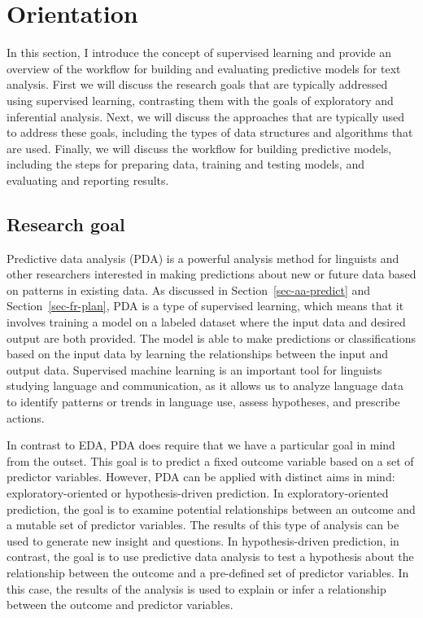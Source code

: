 \documentclass[
  letterpaper,
  DIV=11,
  numbers=noendperiod]{scrreprt}
\theoremstyle{definition}
\theoremstyle{remark}
\begin{document}
\section{Orientation}\label{sec-pda-orientation}

In this section, I introduce the concept of supervised learning and
provide an overview of the workflow for building and evaluating
predictive models for text analysis. First we will discuss the research
goals that are typically addressed using supervised learning,
contrasting them with the goals of exploratory and inferential analysis.
Next, we will discuss the approaches that are typically used to address
these goals, including the types of data structures and algorithms that
are used. Finally, we will discuss the workflow for building predictive
models, including the steps for preparing data, training and testing
models, and evaluating and reporting results.

\subsection{Research goal}\label{sec-pda-research-goal}

Predictive data analysis (PDA) is a powerful analysis method for
linguists and other researchers interested in making predictions about
new or future data based on patterns in existing data. As discussed in
Section~\ref{sec-aa-predict} and Section~\ref{sec-fr-plan}, PDA is a
type of supervised learning, which means that it involves training a
model on a labeled dataset where the input data and desired output are
both provided. The model is able to make predictions or classifications
based on the input data by learning the relationships between the input
and output data. Supervised machine learning is an important tool for
linguists studying language and communication, as it allows us to
analyze language data to identify patterns or trends in language use,
assess hypotheses, and prescribe actions.

In contrast to EDA, PDA does require that we have a particular goal in
mind from the outset. This goal is to predict a fixed outcome variable
based on a set of predictor variables. However, PDA can be applied with
distinct aims in mind: exploratory-oriented or hypothesis-driven
prediction. In exploratory-oriented prediction, the goal is to examine
potential relationships between an outcome and a mutable set of
predictor variables. The results of this type of analysis can be used to
generate new insight and questions. In hypothesis-driven prediction, in
contrast, the goal is to use predictive data analysis to test a
hypothesis about the relationship between the outcome and a pre-defined
set of predictor variables. In this case, the results of the analysis is
used to explain or infer a relationship between the outcome and
predictor variables.
\end{document}
